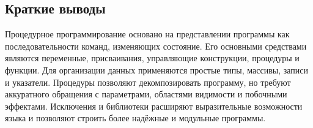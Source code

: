 \documentclass[12pt,a4paper]{article}
\begin{document}
\subsection{Краткие выводы}

Процедурное программирование основано на представлении программы как последовательности команд, изменяющих состояние. Его основными средствами являются переменные, присваивания, управляющие конструкции, процедуры и функции. Для организации данных применяются простые типы, массивы, записи и указатели. Процедуры позволяют декомпозировать программу, но требуют аккуратного обращения с параметрами, областями видимости и побочными эффектами. Исключения и библиотеки расширяют выразительные возможности языка и позволяют строить более надёжные и модульные программы.
\end{document}
